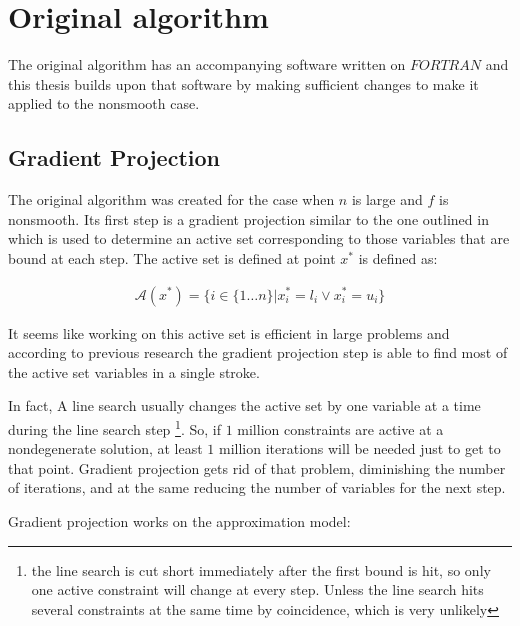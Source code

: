 \chapter{Original algorithm}
\label{ChapterConstraints} %

The original algorithm \citep{mainpaper} has an accompanying software written on $FORTRAN$ \citep{lbfgsbsoftware} and this thesis builds upon that software by making sufficient changes to make it applied to the nonsmooth case.

\section{Gradient Projection}

The original algorithm was created for the case when $n$ is large and $f$ is nonsmooth. Its first step is a gradient projection similar to the one outlined in \citep{gradproj1, gradproj2} which is used to determine an active set corresponding to those variables that are bound at each step. The active set is defined at point $x^*$ is defined as:

\begin{equation}
  \begin{aligned}
    \mathcal{A}(x^*) = \{ i \in \{1 \ldots n\} |  x^*_i = l_i \vee  x^*_i = u_i\}
  \end{aligned}
\end{equation}

It seems like working on this active set is efficient in large problems and according to previous research \citep{nocedal} the gradient projection step is able to find most of the active set variables in a single stroke. 

In fact, A line search usually changes the active set by one variable at a time during the line search step \footnote{the line search is cut short immediately after the first bound is hit, so only one active constraint will change at every step. Unless the line search hits several constraints at the same time by coincidence, which is very unlikely}. So, if $1$ million constraints are active at a nondegenerate solution, at least $1$ million iterations will be needed just to get to that point.  Gradient projection gets rid of that problem, diminishing the number of iterations, and at the same reducing the number of variables for the next step.

Gradient projection works on the approximation model:

